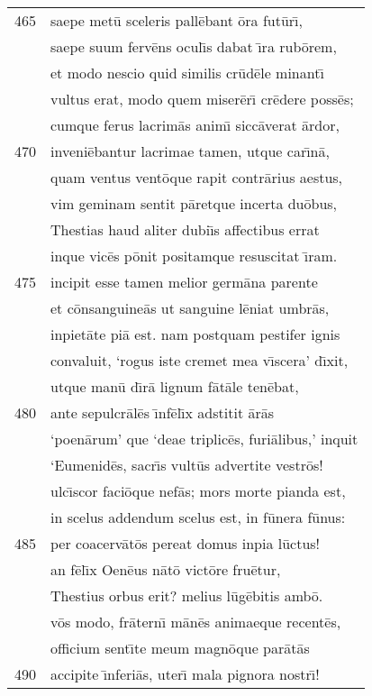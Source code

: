 \documentclass[paper=6in:9in,pagesize=pdftex,
               headinclude=on,footinclude=on,12pt]{scrbook}
\begin{document}
\begin{longtable}[p]{ r l }
465 & saepe met\=u sceleris pall\=ebant \=ora fut\=ur\={\i},\\ 
 & saepe suum ferv\=ens ocul\={\i}s dabat \={\i}ra rub\=orem,\\ 
 & et modo nescio quid similis cr\=ud\=ele minant\={\i}\\ 
 & vultus erat, modo quem miser\=er\={\i} cr\=edere poss\=es;\\ 
 & cumque ferus lacrim\=as anim\={\i} sicc\=averat \=ardor,\\ 
470 & inveni\=ebantur lacrimae tamen, utque car\={\i}n\=a,\\ 
 & quam ventus vent\=oque rapit contr\=arius aestus,\\ 
 & vim geminam sentit p\=aretque incerta du\=obus,\\ 
 & Thestias haud aliter dubi\={\i}s affectibus errat\\ 
 & inque vic\=es p\=onit positamque resuscitat \={\i}ram.\\ 
475 & incipit esse tamen melior germ\=ana parente\\ 
 & et c\=onsanguine\=as ut sanguine l\=eniat umbr\=as,\\ 
 & inpiet\=ate pi\=a est. nam postquam pestifer ignis\\ 
 & convaluit, `rogus iste cremet mea v\={\i}scera' d\={\i}xit,\\ 
 & utque man\=u d\={\i}r\=a lignum f\=at\=ale ten\=ebat,\\ 
480 & ante sepulcr\=al\=es \={\i}nf\=el\={\i}x adstitit \=ar\=as\\ 
 & `poen\=arum' que `deae triplic\=es, furi\=alibus,' inquit\\ 
 & `Eumenid\=es, sacr\={\i}s vult\=us advertite vestr\=os!\\ 
 & ulc\={\i}scor faci\=oque nef\=as; mors morte pianda est,\\ 
 & in scelus addendum scelus est, in f\=unera f\=unus:\\ 
485 & per coacerv\=at\=os pereat domus inpia l\=uctus!\\ 
 & an f\=el\={\i}x Oen\=eus n\=at\=o vict\=ore fru\=etur,\\ 
 & Thestius orbus erit? melius l\=ug\=ebitis amb\=o.\\ 
 & v\=os modo, fr\=atern\={\i} m\=an\=es animaeque recent\=es,\\ 
 & officium sent\={\i}te meum magn\=oque par\=at\=as\\ 
490 & accipite \={\i}nferi\=as, uter\={\i} mala pignora nostr\={\i}!\\ 

\end{longtable}
\end{document}
